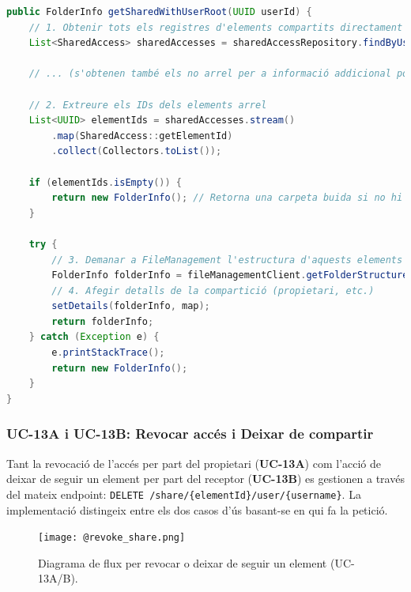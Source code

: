 \begin{lstlisting}[language=Java, caption={Construcció de la carpeta virtual d'elements compartits a `FileSharingService`}]
public FolderInfo getSharedWithUserRoot(UUID userId) {
    // 1. Obtenir tots els registres d'elements compartits directament amb l'usuari
    List<SharedAccess> sharedAccesses = sharedAccessRepository.findByUserIdAndRoot(userId, true);
    
    // ... (s'obtenen també els no arrel per a informació addicional posterior) ...

    // 2. Extreure els IDs dels elements arrel
    List<UUID> elementIds = sharedAccesses.stream()
        .map(SharedAccess::getElementId)
        .collect(Collectors.toList());

    if (elementIds.isEmpty()) {
        return new FolderInfo(); // Retorna una carpeta buida si no hi ha res compartit
    }

    try {
        // 3. Demanar a FileManagement l'estructura d'aquests elements
        FolderInfo folderInfo = fileManagementClient.getFolderStructure(elementIds, false);
        // 4. Afegir detalls de la compartició (propietari, etc.)
        setDetails(folderInfo, map);
        return folderInfo;
    } catch (Exception e) {
        e.printStackTrace();
        return new FolderInfo();
    }
}
\end{lstlisting}

\subsubsection{UC-13A i UC-13B: Revocar accés i Deixar de compartir}

Tant la revocació de l'accés per part del propietari (\textbf{UC-13A}) com l'acció de deixar de seguir un element per part del receptor (\textbf{UC-13B}) es gestionen a través del mateix endpoint: \texttt{DELETE /share/\{elementId\}/user/\{username\}}. La implementació distingeix entre els dos casos d'ús basant-se en qui fa la petició.

\begin{figure}[H]
    \centering
    \texttt{[image: @revoke\_share.png]}
    \caption{Diagrama de flux per revocar o deixar de seguir un element (UC-13A/B).}
\end{figure}


